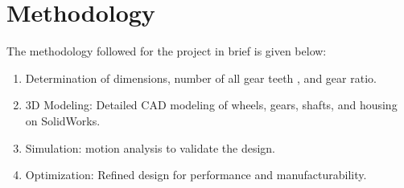 \documentclass[../../main]{subfiles}
\begin{document}

    
    
    
    
    



\section{Methodology}

The methodology followed for the project in brief is given below:

\begin{enumerate}
\def\labelenumi{\arabic{enumi}.}
\item
  Determination of dimensions, number of all gear teeth , and gear
  ratio.
\item
  3D Modeling: Detailed CAD modeling of wheels, gears, shafts, and
  housing on SolidWorks.
\item
  Simulation: motion analysis to validate the design.
\item
  Optimization: Refined design for performance and manufacturability.
\end{enumerate}
\end{document}
